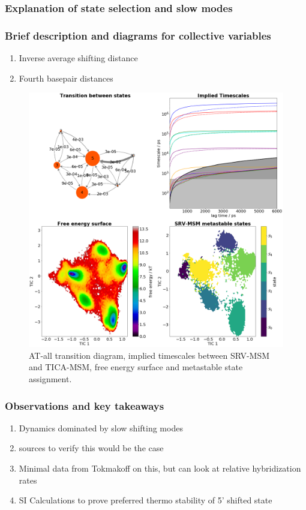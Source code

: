 \documentclass[journal=jpcbfk,manuscript=article]{achemso}
\begin{document}
\subsubsection{\label{sec:Results}Explanation of state selection and slow modes}
\subsubsection{\label{sec:Results}Brief description and diagrams for collective variables}
\begin{enumerate}
	\item Inverse average shifting distance
	\item Fourth basepair distances
\end{enumerate} 

\begin{figure}[ht!]
	\begin{center}
        \includegraphics[width=\textwidth]{Figs/skeleton/AT-all_vis.png}
        \caption{AT-all transition diagram, implied timescales between SRV-MSM and TICA-MSM, free energy surface and metastable state assignment.}
        \label{fig:sample_fray}
	\end{center}
\end{figure}

\subsubsection{\label{sec:Results}Observations and key takeaways}
\begin{enumerate}
	\item Dynamics dominated by slow shifting modes
	\item sources to verify this would be the case
	\item Minimal data from Tokmakoff on this, but can look at relative hybridization rates
	\item SI Calculations to prove preferred thermo stability of 5’ shifted state
\end{enumerate}  
\end{document}
